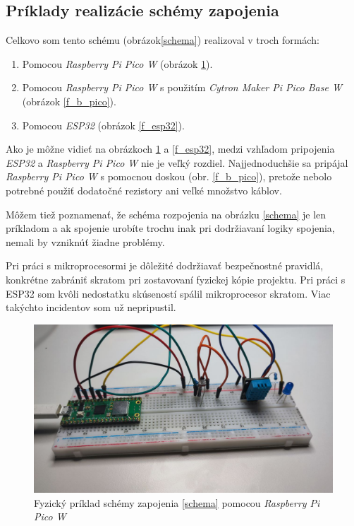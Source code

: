 \subsection{Príklady realizácie schémy zapojenia}
Celkovo som tento schému (obrázok\ref{schema}) realizoval v troch formách:
\begin{enumerate}
    \item Pomocou \textit{Raspberry Pi Pico W} (obrázok \ref{f_pico}).
    \item Pomocou \textit{Raspberry Pi Pico W} s použitím \textit{Cytron Maker Pi Pico Base W} (obrázok \ref{f_b_pico}).
    \item Pomocou \textit{ESP32} (obrázok \ref{f_esp32}). 
\end{enumerate}

Ako je môžne vidieť na obrázkoch \ref{f_pico} a \ref{f_esp32}, medzi vzhľadom pripojenia \textit{ESP32} a \textit{Raspberry Pi Pico W} nie je veľký rozdiel. Najjednoduchšie sa pripájal \textit{Raspberry Pi Pico W} s pomocnou doskou (obr. \ref{f_b_pico}), pretože nebolo potrebné použiť dodatočné rezistory ani veľké množstvo káblov.

Môžem tiež poznamenať, že schéma rozpojenia na obrázku \ref{schema} je len príkladom a ak spojenie urobíte trochu inak pri dodržiavaní logiky spojenia, nemali by vzniknúť žiadne problémy.

Pri práci s mikroprocesormi je dôležité dodržiavať bezpečnostné pravidlá, konkrétne zabrániť skratom pri zostavovaní fyzickej kópie projektu. Pri práci s ESP32 som kvôli nedostatku skúseností spálil mikroprocesor skratom. Viac takýchto incidentov som už nepripustil.

\begin{figure}[!ht]
    \centering
    \includegraphics[width=\textwidth]{figures/f_pico}
    \caption{Fyzický príklad schémy zapojenia \ref{schema} pomocou \textit{Raspberry Pi Pico W} \label{f_pico}}
\end{figure}

